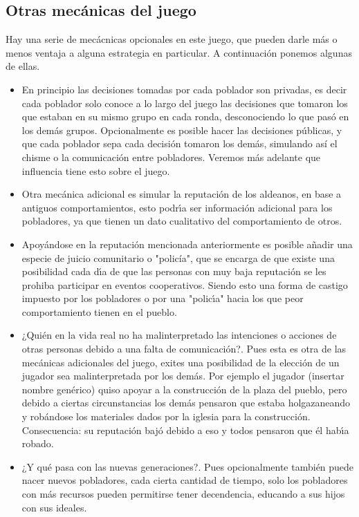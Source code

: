 \documentclass{article}
\begin{document}
\subsection{Otras mec\'anicas del juego}
Hay una serie de mec\'acnicas opcionales en este juego, que pueden darle m\'as o menos ventaja a alguna estrategia en particular.
A continuaci\'on ponemos algunas de ellas.
\begin{itemize}
      \item En principio las decisiones tomadas por cada poblador son privadas, es decir cada poblador solo conoce a lo largo del juego las decisiones
            que tomaron los que estaban en su mismo grupo en cada ronda, desconociendo lo que pas\'o en los dem\'as grupos. Opcionalmente es posible hacer las
            decisiones p\'ublicas, y que cada poblador sepa cada decisi\'on tomaron los dem\'as, simulando as\'i el chisme o la comunicaci\'on entre pobladores.
            Veremos m\'as adelante que influencia tiene esto sobre el juego.
      \item Otra mec\'anica adicional es simular la reputaci\'on de los aldeanos, en base a antiguos comportamientos, esto podr\'{\i}a ser informaci\'on
            adicional para los pobladores, ya que tienen un dato cualitativo del comportamiento de otros.
      \item Apoy\'andose en la reputaci\'on mencionada anteriormente es posible a\~nadir una especie de juicio comunitario o "polic\'ia", que se encarga de que existe una posibilidad
            cada d\'{\i}a de que las personas con muy baja reputaci\'on se les prohiba participar en eventos cooperativos. Siendo esto una forma de castigo impuesto
            por los pobladores o por una "polic\'{\i}a" hacia los que peor comportamiento tienen en el pueblo.
      \item ¿Qui\'en en la vida real no ha malinterpretado las intenciones o acciones de otras personas debido a una falta de comunicaci\'on?. Pues esta es otra de las
            mec\'anicas adicionales del juego, exites una posibilidad de la elecci\'on de un jugador sea malinterpretada por los dem\'as. Por ejemplo el jugador (insertar nombre gen\'erico)
            quiso apoyar a la construcci\'on de la plaza del pueblo, pero debido a ciertas circunstancias los dem\'as pensaron que estaba holgazaneando y rob\'andose los
            materiales dados por la iglesia para la construcci\'on. Consecuencia: su reputaci\'on baj\'o debido a eso y todos pensaron que \'el hab\'{\i}a robado.
      \item ¿Y qu\'e pasa con las nuevas generaciones?. Pues opcionalmente tambi\'en puede nacer nuevos pobladores, cada cierta cantidad de tiempo, solo los pobladores
            con m\'as recursos pueden permitirse tener decendencia, educando a sus hijos con sus ideales.
\end{itemize}
\newpage
\end{document}
